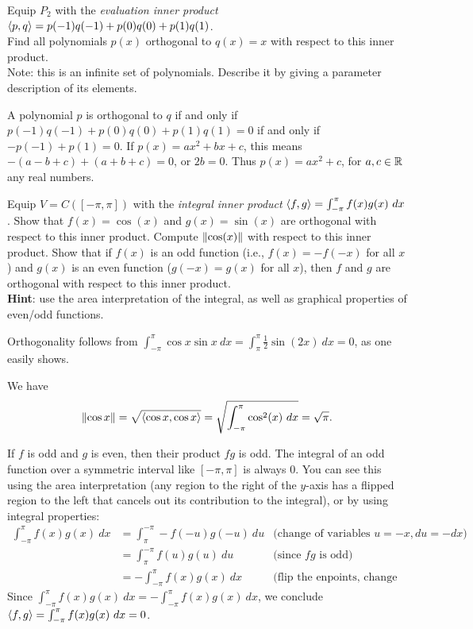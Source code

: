 \ii Equip $P_2$ with the {\em evaluation inner product}  $\langle p,q\rangle=p(-1)q(-1)+p(0)q(0)+p(1)q(1)$. 
\\
Find all polynomials $p(x)$ orthogonal to $q(x)=x$ with respect to this inner product. 
\\
Note: this is an infinite set of polynomials. Describe it by giving a parameter description of its elements.
\\
\begin{solution}
\noindent A polynomial $p$ is orthogonal to $q$ if and only if $p(-1)q(-1)+p(0)q(0)+p(1)q(1)=0$ if and only if $-p(-1)+p(1)=0$. If $p(x)=ax^2+bx+c$, this means $-(a-b+c)+(a+b+c)=0$, or $2b=0$. Thus $p(x)=ax^2+c$, for $a,c\in{\mathbb R}$ any real numbers. 
\end{solution} 
\ii Equip $V=C([-\pi,\pi])$ with the {\em integral inner product} $\angvec{f, g}=\int_{-\pi}^\pi f(x)g(x) \ dx$.
\bb
\ii Show that $f(x)=\cos(x)$ and $g(x)=\sin(x)$ are orthogonal with respect to this inner product. 
\ii Compute $\left\lVert\cos(x)\right\rVert$ with respect to this inner product. 
\ii Show that if $f(x)$ is an odd function (i.e., $f(x)=-f(-x)$ for all $x$) and $g(x)$ is an even function ($g(-x)=g(x)$ for all $x$), then $f$ and $g$ are orthogonal with respect to this inner product.  
\\
{\bf Hint}: use the area interpretation of the integral, as well as graphical properties of even/odd functions. 
\ee 
\begin{solution}
\noindent 
Orthogonality follows from $\int_{-\pi}^\pi \cos x\sin x\ dx=\int_{\pi}^{\pi}\frac{1}{2}\sin(2x)\ dx=0$, as one easily shows. 

We have 
\[
\norm{\cos x}=\sqrt{\angvec{\cos x, \cos x}}=\sqrt{\int_{-\pi}^\pi \cos^2(x) \ dx}=\sqrt{\pi}. 
\]

If $f$ is odd and $g$ is even, then their product $fg$ is odd. The integral of an odd function over a symmetric interval like $[-\pi, \pi]$ is always 0. You can see this using the area interpretation (any region to the right of the $y$-axis has a flipped region to the left that cancels out its contribution to the integral), or by using integral properties:
\begin{align*}
\int_{-\pi}^\pi f(x)g(x) \ dx&=\int_{\pi}^{-\pi} -f(-u)g(-u) \ du &\text{(change of variables $u=-x, du=-dx$)}\\
&= \int_{\pi}^{-\pi} f(u)g(u) \ du&\text{(since $fg$ is odd)}\\
&=-\int_{-\pi}^\pi f(x)g(x) \ dx &\text{(flip the enpoints, change variable name)}
\end{align*}
Since $\int_{-\pi}^\pi f(x)g(x) \ dx=-\int_{-\pi}^\pi f(x)g(x) \ dx$, we conclude $\langle f, g\rangle=\int_{-\pi}^\pi f(x)g(x) \ dx=0$. 
\end{solution}
